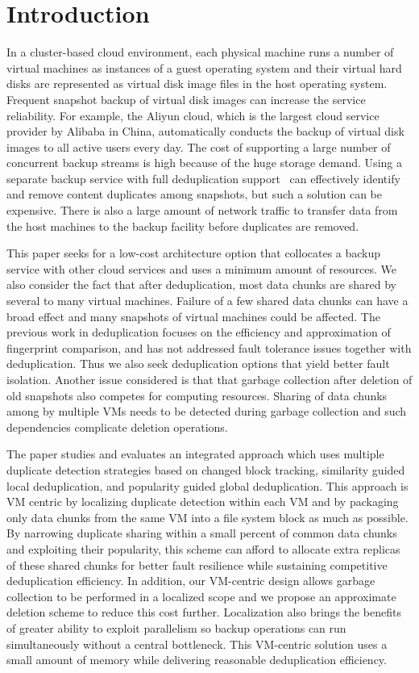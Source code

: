 \section{Introduction}
In a cluster-based cloud environment,
each physical machine runs a number  of virtual machines as  instances of a guest operating system 
and their  virtual hard disks are represented as virtual disk image files in the host operating system.
Frequent  snapshot backup of virtual disk images  can increase  the service reliability. 
For example, the Aliyun cloud, which is  the largest cloud service provider by Alibaba in China, 
automatically conducts  the backup of virtual disk images to all active users every day.
The cost of supporting a large number of concurrent backup streams is high
because of the huge storage demand. 
Using a separate  backup service with full deduplication support~\cite{venti02,bottleneck08}
can effectively identify and remove content duplicates among snapshots, 
but such a solution can be expensive. There is also a large amount of 
network traffic to transfer  data from the host machines to the backup facility
before duplicates are removed.

This paper seeks for a low-cost architecture option  that collocates
a backup service with other cloud services and  uses a minimum amount of resources. 
We also consider the fact that after
deduplication, most data chunks are shared by several to many virtual machines.
Failure of a few shared data chunks can have a 
broad effect and many
snapshots of virtual machines could be affected.
The previous work in deduplication focuses on the efficiency and approximation of
fingerprint comparison, and has not addressed fault tolerance issues  together with deduplication.
Thus we also seek deduplication options that yield better fault isolation.
Another issue considered is that
that garbage collection after deletion of old snapshots also competes for computing resources. 
Sharing of data chunks among by multiple VMs needs to be detected during
garbage collection and such dependencies complicate deletion operations. 

The paper studies and evaluates an integrated approach which uses  multiple duplicate detection strategies
based on changed block tracking, similarity guided local deduplication,
and popularity guided global deduplication. 
This approach is VM centric by localizing duplicate detection within each VM  
and by packaging only data chunks from the same VM into a file system block as much as possible.
By narrowing duplicate sharing within a small percent of common data chunks and exploiting their popularity,
this scheme can afford to allocate extra replicas of these shared chunks for better
fault resilience while sustaining competitive deduplication efficiency.
In addition, our VM-centric design allows garbage collection to be performed in a localized
scope and we propose an approximate deletion scheme to reduce this cost further.
Localization also brings the benefits of greater ability to exploit parallelism so
backup operations can run simultaneously without a central  bottleneck.
This VM-centric solution uses a small amount of  memory while delivering reasonable deduplication efficiency. 

